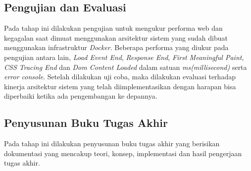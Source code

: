 		\subsection{Pengujian dan Evaluasi}
			Pada tahap ini dilakukan pengujian untuk mengukur performa web dan kegagalan saat dimuat menggunakan arsitektur sistem yang sudah dibuat menggunakan infrastruktur \textit{Docker}. Beberapa performa yang diukur pada pengujian antara lain, \textit{Load Event End}, \textit{Response End}, \textit{First Meaningful Paint}, \textit{CSS Tracing End} dan \textit{Dom Content Loaded} dalam satuan \textit{ms(millisecond)} serta \textit{error console}. Setelah dilakukan uji coba, maka dilakukan evaluasi terhadap kinerja arsitektur sistem yang telah diimplementasikan dengan harapan bisa diperbaiki ketika ada pengembangan ke depannya.
		\subsection{Penyusunan Buku Tugas Akhir}
			Pada tahap ini dilakukan penyusunan buku tugas akhir yang berisikan dokumentasi yang mencakup teori, konsep, implementasi dan hasil pengerjaan tugas akhir.
	
